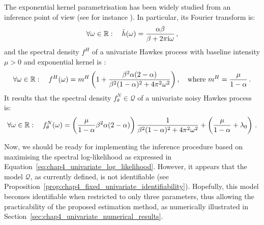           The exponential kernel parametrisation has been widely studied from an inference point of view (see for instance \textcite{Ozaki1979, Bacry2016}).
          In particular, its Fourier transform is:
          \begin{equation}\label{eq:chap4_fourier_exponential}
            \forall \omega \in {\mathbb R}: \quad
            \tilde h(\omega) = \frac{\alpha \beta}{\beta + 2 \pi \mathrm{i} \omega} \,,
          \end{equation}
          and the spectral density $f^H$ of a univariate Hawkes process
          with baseline intensity $\mu > 0$ and exponential kernel
          is \parencite{Hawkes1971}:
          \[
            \forall \omega \in {\mathbb R}: \quad
            f^H(\omega) = m^H \left(1 + \frac{\beta^2 \alpha (2 - \alpha)}{\beta^2 (1 - \alpha)^2 + 4 \pi^2 \omega^2}\right), \quad
            \text{where } m^H = \frac{\mu}{1 - \alpha}\,.
          \]
          It results that the spectral density $f_\theta^N \in \mathcal Q$ of a univariate noisy Hawkes process is:          
          \begin{equation}\label{eq:chap4_exponential_spectral_density}
            \forall \omega \in {\mathbb R}: \quad
          	f_{\theta}^N(\omega) = \left( \frac{\mu}{1-\alpha}{\beta^2 \alpha (2-\alpha)} \right)
          	\frac{1}{\beta^2 (1-\alpha)^2 + 4 \pi^2 \omega^2}
          	+ \left(\frac{\mu}{1-\alpha} + \lambda_0\right)\,.
          \end{equation}
        
        Now, we should be ready for implementing the inference procedure based on maximising the spectral log-likelihood as expressed in Equation~\eqref{eq:chap4_univariate_log_likelihood}.
        However, it appears that the model $\mathcal Q$, as currently defined, is not identifiable (see Proposition~\ref{prop:chap4_fixed_univariate_identifiability}).
        Hopefully, this model becomes identifiable when restricted to only three parameters, thus allowing the practicability of the proposed estimation method,
        as numerically illustrated in Section~\ref{sec:chap4_univariate_numerical_results}.
        
